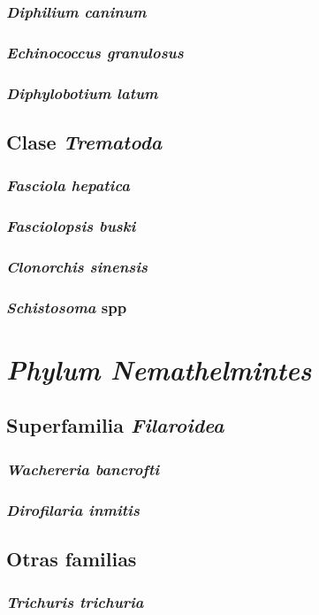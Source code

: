 \documentclass[10pt,a4paper,onecolumn,openany]{book}
\begin{document}
\subsection{\textit{Diphilium caninum}}
\subsection{\textit{Echinococcus granulosus}}
\subsection{\textit{Diphylobotium latum}}
\section{Clase \textit{Trematoda}}
\subsection{\textit{Fasciola hepatica}}
\subsection{\textit{Fasciolopsis buski}}
\subsection{\textit{Clonorchis sinensis}}
\subsection{\textit{Schistosoma} spp}
\chapter{\textit{Phylum Nemathelmintes}}
\section{Superfamilia \textit{Filaroidea}}
\subsection{\textit{Wachereria bancrofti}}
\subsection{\textit{Dirofilaria inmitis}}
\section{Otras familias}
\subsection{\textit{Trichuris trichuria}}
\end{document}
